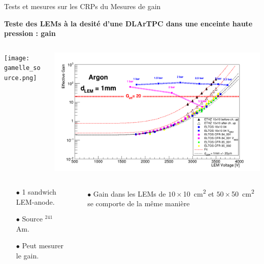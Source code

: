     \begin{frame}{Tests et mesures sur les CRPs du \SSS{}}{Mesures de gain}
    	\begin{scriptsize}
    		\begin{center}\textbf{Teste des LEMs à la desité d'une DLArTPC dans une enceinte haute pression : gain}\\\end{center}
    		\begin{columns}
    			\begin{column}{0.46\textwidth}
    				\centering \texttt{[image: gamelle\_source.png]}
    			\end{column}\hfill
    			\begin{column}{0.58\textwidth}
    				\centering \includegraphics[width=\textwidth]{./pictures/gain.png}
    			\end{column}
    		\end{columns}\vfill
    		\begin{columns}
    			\begin{column}{0.38\textwidth}
    				\begin{itemize}
    					\item[$\bullet$] 1 sandwich LEM-anode.
    					\item[$\bullet$] Source $^{241}$Am.
    					\item[$\bullet$] Peut mesurer le gain.
    				\end{itemize}
    			\end{column}\hfill
    			\begin{column}{0.58\textwidth}
    				\begin{itemize}
    					\item[$\bullet$] Gain dans les LEMs de $10\times$\SI{10}{\centi\meter\squared} et $50\times$\SI{50}{\centi\meter\squared} se comporte de la même manière
    				\end{itemize}
    			\end{column}
    		\end{columns}
    	\end{scriptsize}
    \end{frame}

